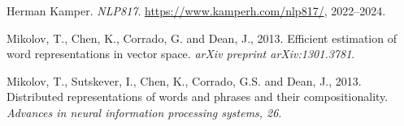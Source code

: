\begin{thebibliography}{1}

	Herman Kamper. \emph{NLP817}. \href{https://www.kamperh.com/nlp817/}{https://www.kamperh.com/nlp817/}, 2022--2024.
	
	 Mikolov, T., Chen, K., Corrado, G. and Dean, J., 2013. Efficient estimation of word representations in vector space. \textit{arXiv preprint arXiv:1301.3781}.

	 Mikolov, T., Sutskever, I., Chen, K., Corrado, G.S. and Dean, J., 2013. Distributed representations of words and phrases and their compositionality. \textit{Advances in neural information processing systems, 26}.
	
	\end{thebibliography}